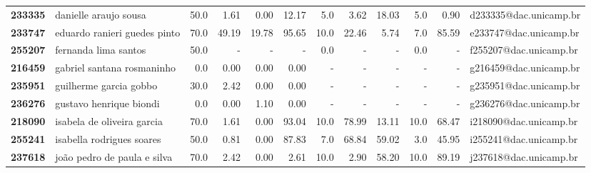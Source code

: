 \documentclass[11pt]{article}
\begin{document}
\begin{center}
\begin{landscape}
\begin{longtable}{llrrrrrrrrrl}
\textbf{233335} &                 danielle araujo sousa &                  50.0 &        1.61 &        0.00 &       12.17 &                      5.0 &        3.62 &       18.03 &                        5.0 &        0.90 &  d233335@dac.unicamp.br \\
\textbf{233747} &          eduardo ranieri guedes pinto &                  70.0 &       49.19 &       19.78 &       95.65 &                     10.0 &       22.46 &        5.74 &                        7.0 &       85.59 &  e233747@dac.unicamp.br \\
\textbf{255207} &                  fernanda lima santos &                  50.0 &           - &           - &           - &                      0.0 &           - &           - &                        0.0 &           - &  f255207@dac.unicamp.br \\
\textbf{216459} &            gabriel santana rosmaninho &                   0.0 &        0.00 &        0.00 &        0.00 &                        - &           - &           - &                          - &           - &  g216459@dac.unicamp.br \\
\textbf{235951} &                guilherme garcia gobbo &                  30.0 &        2.42 &        0.00 &        0.00 &                        - &           - &           - &                          - &           - &  g235951@dac.unicamp.br \\
\textbf{236276} &               gustavo henrique biondi &                   0.0 &        0.00 &        1.10 &        0.00 &                        - &           - &           - &                          - &           - &  g236276@dac.unicamp.br \\
\textbf{218090} &            isabela de oliveira garcia &                  70.0 &        1.61 &        0.00 &       93.04 &                     10.0 &       78.99 &       13.11 &                       10.0 &       68.47 &  i218090@dac.unicamp.br \\
\textbf{255241} &             isabella rodrigues soares &                  50.0 &        0.81 &        0.00 &       87.83 &                      7.0 &       68.84 &       59.02 &                        3.0 &       45.95 &  i255241@dac.unicamp.br \\
\textbf{237618} &           joão pedro de paula e silva &                  70.0 &        2.42 &        0.00 &        2.61 &                     10.0 &        2.90 &       58.20 &                       10.0 &       89.19 &  j237618@dac.unicamp.br \\

\end{longtable}
\end{landscape}
\end{center}
\end{document}
